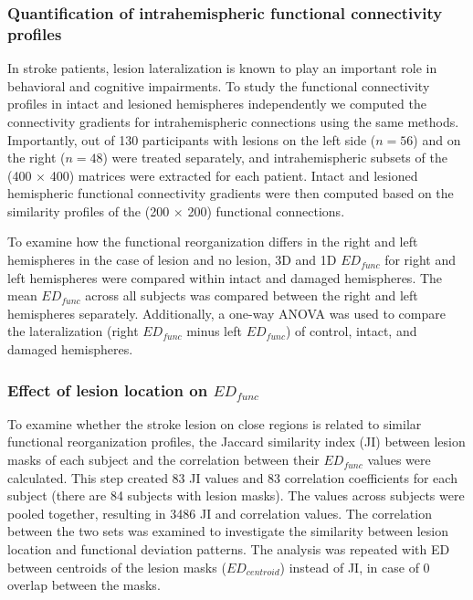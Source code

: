 \documentclass[fleqn,10pt]{wlscirep}
\begin{document}
\subsubsection*{Quantification of intrahemispheric functional connectivity profiles}

In stroke patients, lesion lateralization is known to play an important role in behavioral and cognitive impairments. To study the functional connectivity profiles in intact and lesioned hemispheres independently we computed the connectivity gradients for intrahemispheric connections using the same methods. Importantly, out of 130 participants with lesions on the left side ($n = 56$) and on the right ($n = 48$) were treated separately, and intrahemispheric subsets of the (400 $\times$ 400) matrices were extracted for each patient. Intact and lesioned hemispheric functional connectivity gradients were then computed based on the similarity profiles of the (200 $\times$ 200) functional connections.

To examine how the functional reorganization differs in the right and left hemispheres in the case of lesion and no lesion, 3D and 1D $\textit{ED}_{{func}}$ for right and left hemispheres were compared within intact and damaged hemispheres. The mean $\textit{ED}_{{func}}$ across all subjects was compared between the right and left hemispheres separately. Additionally, a one-way ANOVA was used to compare the lateralization (right \(\textit{ED}_{{func}}\) minus left \(\textit{ED}_{{func}}\)) of control, intact, and damaged hemispheres.

\subsubsection*{Effect of lesion location on $\textit{ED}_{{func}}$}
To examine whether the stroke lesion on close regions is related to similar functional reorganization profiles,  the Jaccard similarity index (JI) between lesion masks of each subject and the correlation between their $\textit{ED}_{{func}}$ values were calculated. This step created 83 JI values and 83 correlation coefficients for each subject (there are 84 subjects with lesion masks). The values across subjects were pooled together, resulting in 3486 JI and correlation values. The correlation between the two sets was examined to investigate the similarity between lesion location and functional deviation patterns. The analysis was repeated with ED between centroids of the lesion masks ($\textit{ED}_{{centroid}}$) instead of JI, in case of 0 overlap between the masks.
\end{document}

